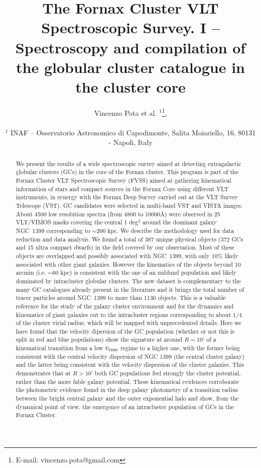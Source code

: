 \documentclass[useAMS,usenatbib]{mn2e}
\title[The Fornax Cluster VLT Spectroscopic Survey]{The Fornax Cluster VLT Spectroscopic Survey. I -- Spectroscopy and compilation of the globular cluster catalogue in the cluster core}
\author[Pota et al.]{\noindent
Vincenzo Pota et al. $^{1}$\thanks{E-mail: vincenzo.pota@gmail.com}, 
\\~\\
$^1$ INAF -- Osservatorio Astronomico di Capodimonte, Salita Moiariello, 16, 80131 - Napoli, Italy\\
}
\begin{document}
\label{firstpage}

\maketitle
\begin{abstract}
We present the results of a wide spectroscopic survey aimed at detecting extragalactic globular clusters (GCs) in the core of the Fornax cluster. This program is part of the Fornax Cluster VLT Spectroscopic Survey (FVSS) aimed at gathering kinematical information of stars and compact sources in the Fornax Core using different VLT instruments, in synergy with the Fornax Deep Survey carried out at the VLT Survey Telescope (VST). GC candidates were selected in multi-band VST and VISTA images. About 4500 low resolution spectra (from 4800 to 10000\AA) were observed in 25 VLT/VIMOS masks covering the central 1 deg$^2$ around the dominant galaxy NGC~1399 corresponding to $\sim$200 kpc. We describe the methodology used for data reduction and data analysis. We found a total of 387 unique physical objects (372 GCs and 15 ultra compact dwarfs) in the field covered by our observation. Most of these objects are overlapped and possibly associated with NGC~1399, with only 10\% likely associated with other giant galaxies. However the kinematics of the objects beyond 10 arcmin (i.e. $\sim$60 kpc) is consistent with the one of an unblund population and likely dominated by intracluster globular clusters. The new dataset is complementary to the many GC catalogues already present in the literature and it brings the total number of tracer particles around  NGC~1399 to more than 1130 objects. This is a valuable reference for the study of the galaxy cluster environment and for the dynamics and kinematics of giant galaxies out to the intracluster regions corresponding to about $1/4$ of the cluster virial radius, which will be mapped with unprecedented details. Here we have found that the velocity dipersion of the GC population (whether or not this is split in red and blue populations) show the signature at around $R\sim10’$ of a kinematical transition from a low $v_{\rm rms}$ regime to a higher one, with the former being consistent with the central velocity dispersion of NGC 1399 (the central cluster galaxy) and the latter being consistent with the velocity dispersion of the cluster galaxies. This demonstrates that at $R>10’$ both GC populations feel strongly the cluster potential, rather than the more fable galaxy potential. These kinematical evidences corroborate the photometric evidence found in the deep galaxy photometry of a transition radius between the bright central galaxy and the outer exponential halo and show, from the dynamical point of view, the emergence of an intracluster population of GCs in the Fornax Cluster.

\end{abstract}
\end{document}
